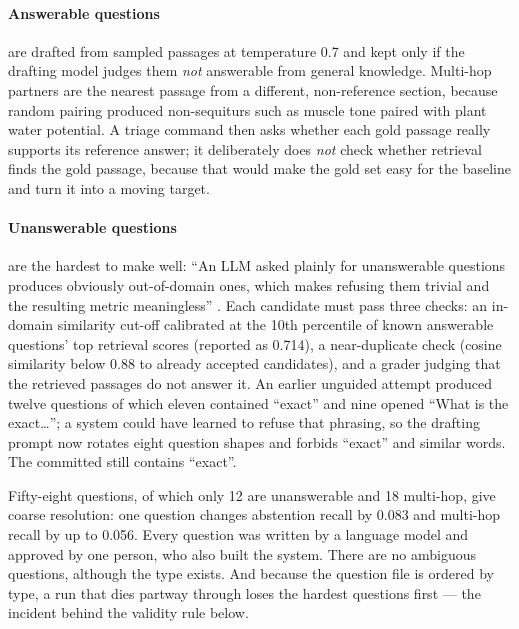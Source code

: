 \paragraph{Answerable questions} are drafted from sampled passages at temperature 0.7 and kept only if the drafting model judges them \emph{not} answerable from general knowledge. Multi-hop partners are the nearest passage from a different, non-reference section, because random pairing produced non-sequiturs such as muscle tone paired with plant water potential. A triage command then asks whether each gold passage really supports its reference answer; it deliberately does \emph{not} check whether retrieval finds the gold passage, because that would make the gold set easy for the baseline and turn it into a moving target.

\paragraph{Unanswerable questions} are the hardest to make well: \enquote{An LLM asked plainly for unanswerable questions produces obviously out-of-domain ones, which makes refusing them trivial and the resulting metric meaningless} . Each candidate must pass three checks: an in-domain similarity cut-off calibrated at the 10th percentile of known answerable questions' top retrieval scores (reported as 0.714), a near-duplicate check (cosine similarity below 0.88 to already accepted candidates), and a grader judging that the retrieved passages do not answer it. An earlier unguided attempt produced twelve questions of which eleven contained \enquote{exact} and nine opened \enquote{What is the exact\ldots}; a system could have learned to refuse that phrasing, so the drafting prompt now rotates eight question shapes and forbids \enquote{exact} and similar words. The committed  still contains \enquote{exact}.

\begin{inferred}
Fifty-eight questions, of which only 12 are unanswerable and 18 multi-hop, give coarse resolution: one question changes abstention recall by 0.083 and multi-hop recall by up to 0.056. Every question was written by a language model and approved by one person, who also built the system. There are no ambiguous questions, although the type exists. And because the question file is ordered by type, a run that dies partway through loses the hardest questions first --- the incident behind the validity rule below.
\end{inferred}

